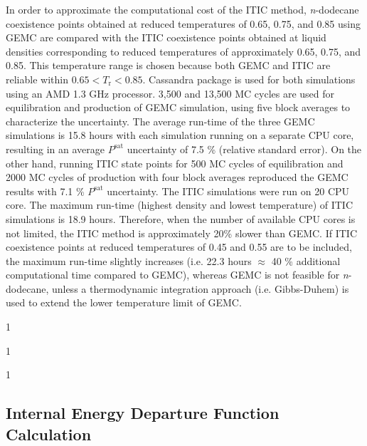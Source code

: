 \documentclass[5p,times]{elsarticle}
\begin{document}
In order to approximate the computational cost of the ITIC method, \textit{n}-dodecane  coexistence points obtained at reduced temperatures of 0.65, 0.75, and 0.85 using  GEMC are compared with the ITIC coexistence points obtained at liquid densities corresponding to reduced temperatures of approximately 0.65, 0.75, and 0.85. This temperature range is chosen because both  GEMC and ITIC are reliable within $0.65<T_\mathrm{r}<0.85$. Cassandra package is used for both simulations using an AMD 1.3 GHz processor. 3,500 and 13,500 MC cycles are used for equilibration and production of GEMC simulation, using five block averages to characterize the uncertainty. The average run-time of the three GEMC simulations is 15.8 hours with each simulation running on a separate CPU core, resulting in an average $P^\mathrm{sat}$ uncertainty of 7.5 \% (relative standard error). On the other hand, running ITIC state points for 500 MC cycles of equilibration and 2000 MC cycles of production with four block averages reproduced the GEMC results with 7.1 \% $P^\mathrm{sat}$ uncertainty. The ITIC simulations were run on 20 CPU core. The maximum run-time (highest density and lowest temperature) of ITIC simulations is 18.9 hours. Therefore, when the number of available CPU cores is not limited, the ITIC method is approximately 20\% slower than GEMC. If ITIC coexistence points at reduced temperatures of 0.45 and 0.55 are to be included, the maximum run-time slightly increases (i.e. 22.3 hours $\approx$ 40 \% additional computational time compared to GEMC), whereas GEMC is not feasible for \textit{n}-dodecane, unless a thermodynamic integration approach (i.e. Gibbs-Duhem) is used to extend the lower temperature limit of GEMC.


1

1

1


\subsection{Internal Energy Departure Function Calculation}\label{sec:udepCalc}
\end{document}
